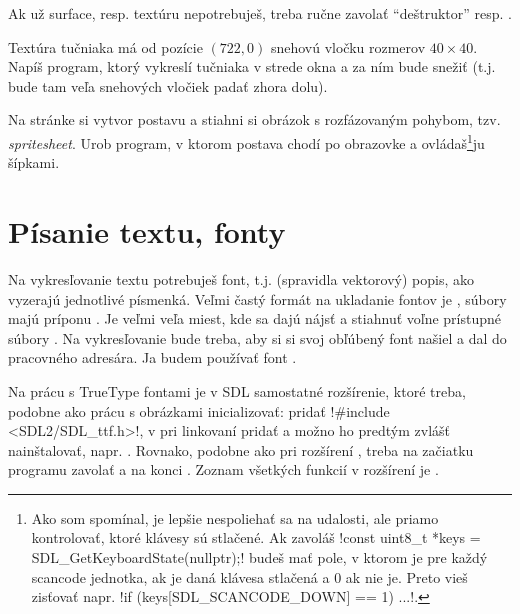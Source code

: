 Ak už surface, resp. textúru nepotrebuješ, treba ručne zavolať ``deštruktor''  resp. .

\begin{uloha}
  Textúra tučniaka má od pozície $(722,0)$ snehovú vločku rozmerov $40\times40$. Napíš program, ktorý vykreslí tučniaka v strede okna a za ním bude snežiť (t.j. bude
  tam veľa snehových vločiek padať zhora dolu).
\end{uloha}

\begin{uloha}
  Na stránke 
   si vytvor postavu a stiahni si  obrázok s rozfázovaným
  pohybom, tzv. {\em spritesheet}. Urob program, v ktorom postava chodí po obrazovke a  ovládaš\footnote{%
    Ako som spomínal, je lepšie nespoliehať sa na udalosti, ale priamo kontrolovať,
    ktoré klávesy sú stlačené. Ak zavoláš \prg!const uint8_t *keys = SDL_GetKeyboardState(nullptr);!
    budeš mať pole, v ktorom je pre každý scancode jednotka, ak je daná klávesa stlačená a 0 ak nie je.
    Preto vieš zisťovať napr. \prg!if (keys[SDL_SCANCODE_DOWN] == 1) {...}!.
  }ju šípkami.
\end{uloha}

\section*{Písanie textu, fonty}

Na vykresľovanie textu potrebuješ font, t.j. (spravidla vektorový) popis, ako vyzerajú jednotlivé písmenká. Veľmi častý formát na ukladanie fontov je , súbory majú príponu . Je veľmi veľa miest, kde
sa dajú nájsť a stiahnuť voľne prístupné súbory . Na vykresľovanie bude treba, aby si si svoj obľúbený font našiel a dal do pracovného adresára. Ja budem používať font 
.

Na prácu s TrueType fontami je v SDL samostatné rozšírenie, ktoré treba, podobne ako prácu s obrázkami inicializovať: pridať \prg!#include <SDL2/SDL_ttf.h>!, v  pri linkovaní pridať 
a možno ho predtým zvlášť nainštalovať, napr. . Rovnako, podobne ako pri rozšírení , treba na začiatku programu zavolať
 a na konci . Zoznam všetkých funkcií v rozšírení  je .

